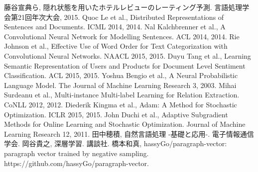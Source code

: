 
\begin{thebibliography}{9}
  藤谷宣典ら,
  隠れ状態を用いたホテルレビューのレーティング予測.
  言語処理学会第21回年次大会, 2015.
  Quoc Le et al.,
  Distributed Representations of Sentences and Documents.
  ICML 2014, 2014.
  Nal Kalchbrenner et al.,
  A Convolutional Neural Network for Modelling Sentences.
  ACL 2014, 2014.
  Rie Johnson et al.,
  Effective Use of Word Order for Text Categorization
  with Convolutional Neural Networks.
  NAACL 2015, 2015.
  Duyu Tang et al.,
  Learning Semantic Representation of Users and Products
  for Document Level Sentiment Classification.
  ACL 2015, 2015.
  Yoshua Bengio et al.,
  A Neural Probabilistic Language Model.
  The Journal of Machine Learning Research 3, 2003.
  Mihai Surdeanu et al.,
  Multi-instance Multi-label Learning for Relation Extraction.
  CoNLL 2012, 2012.
  Diederik Kingma et al.,
  Adam: A Method for Stochastic Optimization.
  ICLR 2015, 2015.
  John Duchi et al.,
  Adaptive Subgradient Methods for Online Learning and Stochastic Optimization.
  Journal of Machine Learning Research 12, 2011.
  田中穂積,
  自然言語処理 -基礎と応用-.
  電子情報通信学会.
  岡谷貴之,
  深層学習.
  講談社.
  橋本和真,
  hassyGo/paragraph-vector: paragraph vector trained by negative sampling.
  https://github.com/hassyGo/paragraph-vector.
\end{thebibliography}
